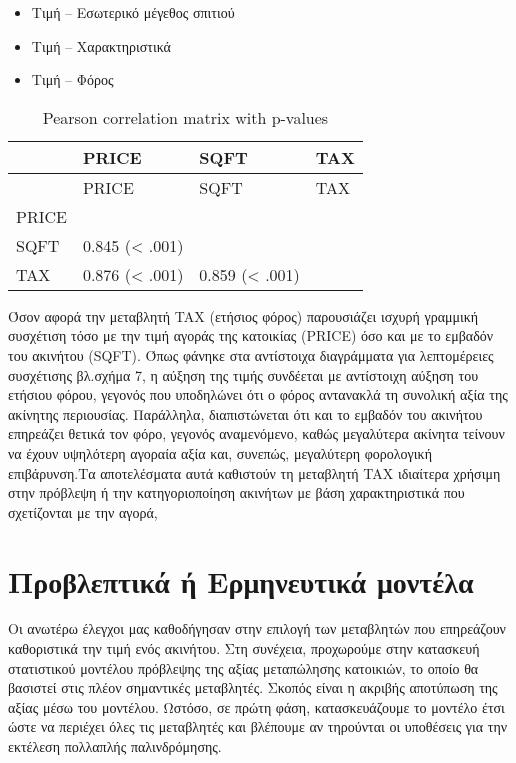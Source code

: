 \documentclass[
  10pt,
]{article}
\begin{document}
\begin{itemize}
  \item Τιμή -- Εσωτερικό μέγεθος σπιτιού
  \item Τιμή -- Χαρακτηριστικά
  \item Τιμή -- Φόρος
\end{itemize}

\begin{longtable}[]{@{}llll@{}}
\caption{Pearson correlation matrix with p-values}\tabularnewline
\toprule\noalign{}
& PRICE & SQFT & TAX \\
\midrule\noalign{}
\endfirsthead
\toprule\noalign{}
& PRICE & SQFT & TAX \\
\midrule\noalign{}
\endhead
\bottomrule\noalign{}
\endlastfoot
PRICE & & & \\
SQFT & 0.845 (\textless{} .001) & & \\
TAX & 0.876 (\textless{} .001) & 0.859 (\textless{} .001) & \\
\end{longtable}

Όσον αφορά την μεταβλητή TAX (ετήσιος φόρος) παρουσιάζει ισχυρή γραμμική
συσχέτιση τόσο με την τιμή αγοράς της κατοικίας (PRICE) όσο και με το
εμβαδόν του ακινήτου (SQFT). Όπως φάνηκε στα αντίστοιχα διαγράμματα για
λεπτομέρειες συσχέτισης βλ.σχήμα 7, η αύξηση της τιμής συνδέεται με
αντίστοιχη αύξηση του ετήσιου φόρου, γεγονός που υποδηλώνει ότι ο φόρος
αντανακλά τη συνολική αξία της ακίνητης περιουσίας. Παράλληλα,
διαπιστώνεται ότι και το εμβαδόν του ακινήτου επηρεάζει θετικά τον φόρο,
γεγονός αναμενόμενο, καθώς μεγαλύτερα ακίνητα τείνουν να έχουν υψηλότερη
αγοραία αξία και, συνεπώς, μεγαλύτερη φορολογική επιβάρυνση.Τα
αποτελέσματα αυτά καθιστούν τη μεταβλητή TAX ιδιαίτερα χρήσιμη στην
πρόβλεψη ή την κατηγοριοποίηση ακινήτων με βάση χαρακτηριστικά που
σχετίζονται με την αγορά,

\section*{Προβλεπτικά ή Ερμηνευτικά μοντέλα}

Οι ανωτέρω έλεγχοι μας καθοδήγησαν στην επιλογή των μεταβλητών που
επηρεάζουν καθοριστικά την τιμή ενός ακινήτου. Στη συνέχεια, προχωρούμε
στην κατασκευή στατιστικού μοντέλου πρόβλεψης της αξίας μεταπώλησης
κατοικιών, το οποίο θα βασιστεί στις πλέον σημαντικές μεταβλητές. Σκοπός
είναι η ακριβής αποτύπωση της αξίας μέσω του μοντέλου. Ωστόσο, σε πρώτη
φάση, κατασκευάζουμε το μοντέλο έτσι ώστε να περιέχει όλες τις
μεταβλητές και βλέπουμε αν τηρούνται οι υποθέσεις για την εκτέλεση
πολλαπλής παλινδρόμησης.
\end{document}
